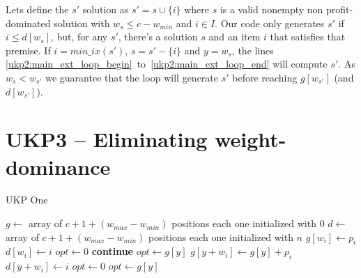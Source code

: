 \documentclass[12pt]{article}
\begin{document}
Lets define the \(s'\) solution as \(s' = s \cup \{i\}\) where \(s\) is a valid nonempty non profit-dominated solution with \(w_s \leq c-w_{min}\) and \(i \in I\). Our code only generates \(s'\) if \(i \leq d[w_s]\), but, for any \(s'\), there's a solution \(s\) and an item \(i\) that satisfies that premise. If \(i = min\_ix(s')\), \(s = s' - \{i\}\) and \(y = w_s\), the lines \ref{ukp2:main_ext_loop_begin}~to~\ref{ukp2:main_ext_loop_end} will compute \(s'\). As \(w_s < w_{s'}\) we guarantee that the loop will generate \(s'\) before reaching \(g[w_{s'}]\) (and \(d[w_{s'}]\)).

\section{UKP3 -- Eliminating weight-dominance}
\begin{algorithm}
\caption{UKP One}\label{alg:ukp1}
\begin{algorithmic}[1]
  \State \(g \gets\) array of \(c + 1 + (w_{max} - w_{min})\) positions each one initialized with \(0\)\label{ukp3:create_g}
  \State \(d \gets\) array of \(c + 1 + (w_{max} - w_{min})\) positions each one initialized with \(n\)\label{ukp3:create_d}
  \State %
  \label{ukp3:begin_trivial_bounds}
      \State \(g[w_i] \gets p_i\)
      \State \(d[w_i] \gets i\)
    \EndIf
  \EndFor\label{ukp3:end_trivial_bounds}
  \State %
  \State \underline{\(opt \gets 0\)}
  \label{ukp3:main_ext_loop_begin}
    \label{ukp3:if_equal_to_zero}
    	\State \textbf{continue}
    \EndIf\label{ukp3:if_equal_to_zero}
    \State %
    \State \underline{\(opt \gets g[y]\)}
    \State %
    \label{ukp3:main_inner_loop_begin}
      \label{ukp3:if_better_solution_begin}
        \State \(g[y + w_i] \gets g[y] + p_i\)
        \State \(d[y + w_i] \gets i\)
      \EndIf\label{ukp3:if_better_solution_end}
    \EndFor\label{ukp3:main_inner_loop_end}
  \EndFor\label{ukp3:main_ext_loop_end}
  \State %
  \State \sout{\(opt \gets 0\)}
  \label{ukp3:get_opt_loop_begin}
    \label{ukp3:opt_loop_if}
      \State \(opt \gets g[y]\)
    \EndIf
  \EndFor\label{ukp3:get_opt_loop_end}
\EndProcedure
\end{algorithmic}
\end{algorithm}
\end{document}
